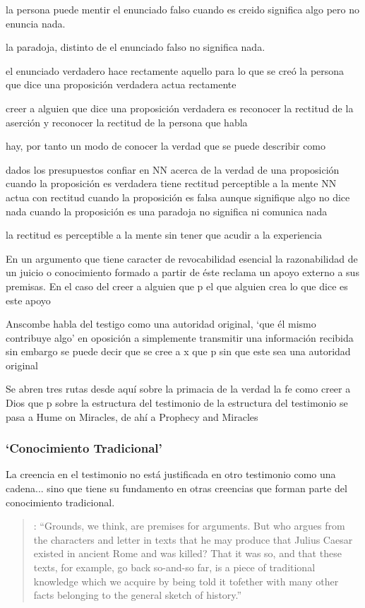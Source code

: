 la persona puede mentir
el enunciado falso cuando es creido significa algo pero no enuncia nada.

la paradoja, distinto de el enunciado falso no significa nada.

el enunciado verdadero hace rectamente aquello para lo que se creó
la persona que dice una proposición verdadera actua rectamente

creer a alguien que dice una proposición verdadera es reconocer la rectitud de la aserción y reconocer la rectitud de la persona que habla

hay, por tanto un modo de conocer la verdad que se puede describir como

dados los presupuestos
confiar en NN acerca de la verdad de una proposición
cuando la proposición es verdadera tiene rectitud perceptible a la mente
NN actua con rectitud
cuando la proposición es falsa aunque signifique algo no dice nada
cuando la proposición es una paradoja no significa ni comunica nada

la rectitud es perceptible a la mente sin tener que acudir a la experiencia



En un argumento que tiene caracter de revocabilidad esencial la razonabilidad de un juicio o conocimiento formado a partir de éste reclama un apoyo externo a sus premisas. En el caso del creer a alguien que p el que alguien crea lo que dice es este apoyo

Anscombe habla del testigo como una autoridad original, `que él mismo contribuye algo' en oposición a simplemente transmitir una información recibida sin embargo se puede decir que se cree a x que p sin que este sea una autoridad original

Se abren tres rutas desde aquí sobre la primacia de la verdad la fe como creer a Dios que p sobre la estructura del testimonio de la estructura del testimonio se pasa a Hume on Miracles, de ahí a Prophecy and Miracles

\subsubsection{`Conocimiento Tradicional'}

La creencia en el testimonio no está justificada en otro testimonio como una cadena... sino que tiene su fundamento en otras creencias que forman parte del conocimiento tradicional.

\blockquote[{\cite[121--122]{anscombe2015logic:grounds}}: \enquote{Grounds, we think, are premises for arguments. But who argues from the characters and letter in texts that he may produce that Julius Caesar existed in ancient Rome and was killed? That it was so, and that these texts, for example, go back so-and-so far, is a piece of traditional knowledge which we acquire by being told it tofether with many other facts belonging to the general sketch of history.}]{}

